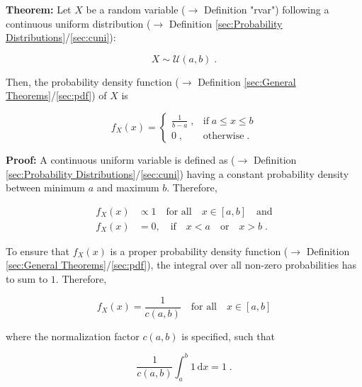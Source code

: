 \documentclass[a4paper,12pt]{book}
\begin{document}
\vspace{1em}
\textbf{Theorem:} Let $X$ be a random variable ($\rightarrow$ Definition "rvar") following a continuous uniform distribution ($\rightarrow$ Definition \ref{sec:Probability Distributions}/\ref{sec:cuni}):

\begin{equation} \label{eq:cuni-pdf-cuni}
X \sim \mathcal{U}(a, b) \; .
\end{equation}

Then, the probability density function ($\rightarrow$ Definition \ref{sec:General Theorems}/\ref{sec:pdf}) of $X$ is

\begin{equation} \label{eq:cuni-pdf-cuni-pdf}
f_X(x) = \left\{
\begin{array}{rl}
\frac{1}{b-a} \; , & \text{if} \; a \leq x \leq b \\
0 \; , & \text{otherwise} \; .
\end{array}
\right.
\end{equation}


\vspace{1em}
\textbf{Proof:} A continuous uniform variable is defined as ($\rightarrow$ Definition \ref{sec:Probability Distributions}/\ref{sec:cuni}) having a constant probability density between minimum $a$ and maximum $b$. Therefore,

\begin{equation} \label{eq:cuni-pdf-cuni-pdf-s1}
\begin{split}
f_X(x) &\propto 1 \quad \text{for all} \quad x \in [a,b] \quad \text{and} \\
f_X(x) &= 0, \quad\!\! \text{if} \quad x < a \quad \text{or} \quad x > b \; .
\end{split}
\end{equation}

To ensure that $f_X(x)$ is a proper probability density function ($\rightarrow$ Definition \ref{sec:General Theorems}/\ref{sec:pdf}), the integral over all non-zero probabilities has to sum to $1$. Therefore,

\begin{equation} \label{eq:cuni-pdf-cuni-pdf-s2}
f_X(x) = \frac{1}{c(a,b)} \quad \text{for all} \quad x \in [a,b]
\end{equation}

where the normalization factor $c(a,b)$ is specified, such that

\begin{equation} \label{eq:cuni-pdf-cuni-pdf-s3}
\frac{1}{c(a,b)} \int_{a}^{b} 1 \, \mathrm{d}x = 1 \; .
\end{equation}
\end{document}
